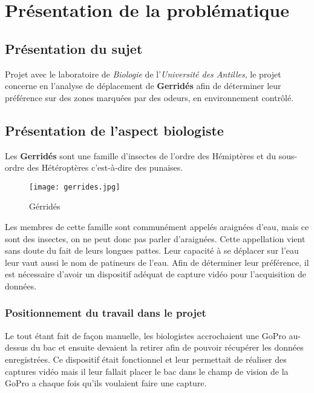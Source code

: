 \chapter{Présentation de la problématique}
    \section{Présentation du sujet}
    Projet avec le laboratoire de \textit{Biologie} de l'\textit{Université des Antilles}, le projet concerne en l'analyse de déplacement de \textbf{Gerridés} afin de déterminer leur préférence sur des zones marquées par des odeurs, en environnement contrôlé.


    \section{Présentation de l'aspect biologiste}
    Les \textbf{Gerridés} sont une famille d'insectes de l'ordre des Hémiptères et du sous-ordre des Hétéroptères c'est-à-dire des punaises.
    \begin{figure}[ht]
        \centering
        \texttt{[image: gerrides.jpg]}
        \caption{Gérridés}        
    \end{figure}

    \vspace{0.1cm}

    
    Les membres de cette famille sont communément appelés araignées d’eau, mais ce sont des insectes, on ne peut donc pas parler d'araignées. Cette appellation vient sans doute du fait de leurs longues pattes. Leur capacité à se déplacer sur l'eau leur vaut aussi le nom de patineurs de l'eau.
    Afin de déterminer leur préférence, il est nécessaire d'avoir un dispositif adéquat de capture vidéo pour l'acquisition de données.
     

    \subsection{Positionnement du travail dans le projet}
        Le tout étant fait de façon manuelle, les biologistes accrochaient une GoPro au-dessus du bac et ensuite devaient la retirer afin de pouvoir récupérer les données enregistrées. Ce dispositif était fonctionnel et leur permettait de réaliser des captures vidéo mais il leur fallait placer le bac dans le champ de vision de la GoPro a chaque fois qu'ils voulaient faire une capture.

